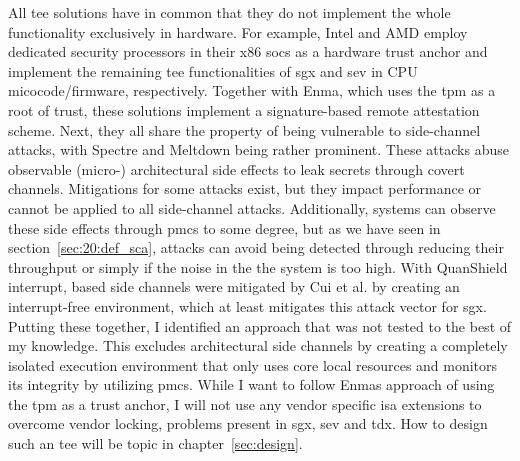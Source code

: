 All \gls{tee} solutions have in common that they do not implement the whole
functionality exclusively in hardware. For example, Intel and AMD employ
dedicated security processors in their x86 \glspl{soc} as a hardware trust
anchor and implement the remaining \gls{tee} functionalities of \gls{sgx} and
\gls{sev} in CPU micocode/firmware, respectively. Together with Enma, which uses
the \gls{tpm} as a root of trust, these solutions implement a signature-based
remote attestation scheme. Next, they all share the property of being vulnerable
to side-channel attacks, with Spectre and Meltdown being rather prominent. These
attacks abuse observable (micro-) architectural side effects to leak secrets
through covert channels. Mitigations for some attacks exist, but they impact
performance or cannot be applied to all side-channel attacks. Additionally,
systems can observe these side effects through \glspl{pmc} to some degree, but
as we have seen in section~\ref{sec:20:def_sca}, attacks can avoid being
detected through reducing their throughput or simply if the noise in the the
system is too high. With QuanShield interrupt, based side channels were
mitigated by Cui et al. by creating an interrupt-free environment, which at
least mitigates this attack vector for \gls{sgx}.\\

Putting these together, I identified an approach that was not tested to the best
of my knowledge. This excludes architectural side channels by creating a
completely isolated execution environment that only uses core local resources
and monitors its integrity by utilizing \glspl{pmc}. While I want to follow
Enmas approach of using the \gls{tpm} as a trust anchor, I will not use any
vendor specific \gls{isa} extensions to overcome vendor locking, problems
present in \gls{sgx}, \gls{sev} and \gls{tdx}. How to design such an \gls{tee}
will be topic in chapter~\ref{sec:design}.

\cleardoublepage


